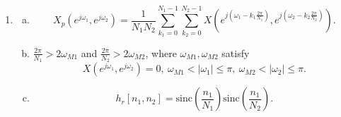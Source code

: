 \documentclass{article}
\newcommand{\sinc}{\text{sinc}}
\begin{document}
\begin{enumerate}
            \item 
            \begin{enumerate}[(a)]
                \item \[
                    X_p(e^{j\omega_1}, e^{j\omega_2}) = \frac{1}{N_1N_2} \sum\limits_{k_1=0}^{N_1 - 1} \sum\limits_{k_2=0}^{N_2 - 1} X(e^{j(\omega_1 - k_1 \frac{2\pi}{N_1})},e^{j(\omega_2 - k_2 \frac{2\pi}{N_2})}). 
                \]
                \item $\frac{2\pi}{N_1} > 2 \omega_{M1}$ and $\frac{2\pi}{N_2} > 2\omega_{M 2}$, where $\omega_{M 1}, \omega_{M 2}$ satisfy \[
                    X(e^{j\omega_1}, e^{j\omega_2}) = 0,\ 
                    \omega_{M 1} < \left\vert \omega_1 \right\vert \le \pi,\ 
                    \omega_{M 2} < \left\vert \omega_2 \right\vert \le \pi.
                \]
                \item \[
                    h_r[n_1, n_2] = \sinc\left( \frac{n_1}{N_1}\right) \sinc\left( \frac{n_1}{N_2}\right).
                \]
            \end{enumerate}	
        \end{enumerate}
        \newpage
\end{document}
